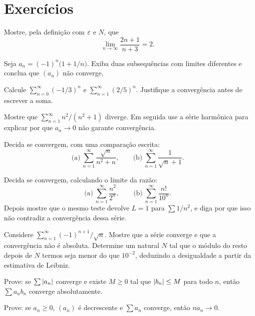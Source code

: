 \documentclass[11pt,a4paper]{article}
\begin{document}
\section{Exercícios}

\begin{exercicio}
Mostre, pela definição com \(\varepsilon\) e \(N\), que
\[
\lim_{n\to\infty}\frac{2n+1}{n+3}=2.
\]
\end{exercicio}

\begin{exercicio}
Seja \(a_n=(-1)^n\bigl(1+1/n\bigr)\). Exiba duas subsequências com limites diferentes e conclua que \((a_n)\) não converge.
\end{exercicio}

\begin{exercicio}
Calcule \(\sum_{n=0}^\infty (-1/3)^n\) e \(\sum_{n=1}^\infty (2/5)^n\). Justifique a convergência antes de escrever a soma.
\end{exercicio}

\begin{exercicio}
Mostre que \(\sum_{n=1}^\infty n^2/(n^2+1)\) diverge. Em seguida use a série harmônica para explicar por que \(a_n\to 0\) não garante convergência.
\end{exercicio}

\begin{exercicio}
Decida se convergem, com uma comparação escrita:
\[
\text{(a)}\ \sum_{n=1}^\infty\frac{\sqrt{n}}{n^2+n},
\qquad
\text{(b)}\ \sum_{n=1}^\infty\frac{1}{\sqrt{n}+1}.
\]
\end{exercicio}

\begin{exercicio}
Decida se convergem, calculando o limite da razão:
\[
\text{(a)}\ \sum_{n=1}^\infty\frac{n^2}{2^n},
\qquad
\text{(b)}\ \sum_{n=1}^\infty\frac{n!}{10^n}.
\]
Depois mostre que o mesmo teste devolve \(L=1\) para \(\sum 1/n^2\), e diga por que isso não contradiz a convergência dessa série.
\end{exercicio}

\begin{exercicio}
Considere \(\sum_{n=1}^\infty (-1)^{n+1}/\sqrt{n}\). Mostre que a série converge e que a convergência não é absoluta. Determine um natural \(N\) tal que o módulo do resto depois de \(N\) termos seja menor do que \(10^{-2}\), deduzindo a desigualdade a partir da estimativa de Leibniz.
\end{exercicio}

\begin{exercicio}
Prove: se \(\sum\left\lvert a_n \right\rvert\) converge e existe \(M\ge 0\) tal que \(\left\lvert b_n \right\rvert\le M\) para todo \(n\), então \(\sum a_nb_n\) converge absolutamente.
\end{exercicio}

\begin{exercicio}[Avançado — \(n a_n\)]
Prove: se \(a_n\ge 0\), \((a_n)\) é decrescente e \(\sum a_n\) converge, então \(n a_n\to 0\).
\end{exercicio}
\end{document}
